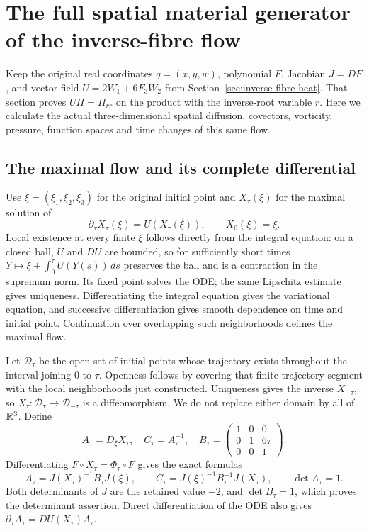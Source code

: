 \section{The full spatial material generator of the inverse-fibre flow}
\label{sec:material-generator}

Keep the original real coordinates $q=(x,y,w)$, polynomial $F$, Jacobian
$J=DF$, and vector field $U=2W_1+6F_3W_2$ from
Section~\ref{sec:inverse-fibre-heat}. That section proves $U\Pi=\Pi_{rr}$
on the product with the inverse-root variable $r$. Here we calculate the
actual three-dimensional spatial diffusion, covectors, vorticity,
pressure, function spaces and time changes of this same flow.

\subsection{The maximal flow and its complete differential}

Use $\xi=(\xi_1,\xi_2,\xi_3)$ for the original initial point and
$X_\tau(\xi)$ for the maximal solution of
\[
 \partial_\tau X_\tau(\xi)=U(X_\tau(\xi)),\qquad X_0(\xi)=\xi.
\]
Local existence at every finite $\xi$ follows directly from the integral
equation: on a closed ball, $U$ and $DU$ are bounded, so for sufficiently
short times $Y\mapsto\xi+\int_0^\tau U(Y(s))\,ds$ preserves the ball and
is a contraction in the supremum norm. Its fixed point solves the ODE;
the same Lipschitz estimate gives uniqueness. Differentiating the integral
equation gives the variational equation, and successive differentiation
gives smooth dependence on time and initial point. Continuation over
overlapping such neighborhoods defines the maximal flow.

Let $\mathcal D_\tau$ be the open set of initial points whose trajectory
exists throughout the interval joining $0$ to $\tau$. Openness follows
by covering that finite trajectory segment with the local neighborhoods
just constructed. Uniqueness gives the inverse $X_{-\tau}$, so
$X_\tau:\mathcal D_\tau\to\mathcal D_{-\tau}$ is a diffeomorphism.
We do not replace either domain by all of $\mathbb R^3$.
Define
\[
 A_\tau=D_\xi X_\tau,\quad C_\tau=A_\tau^{-1},\quad
 B_\tau=\begin{pmatrix}1&0&0\\0&1&6\tau\\0&0&1\end{pmatrix}.
\]
Differentiating $F\circ X_\tau=\Phi_\tau\circ F$ gives the exact formulas
\begin{equation}\label{eq:mg-A}
 A_\tau=J(X_\tau)^{-1}B_\tau J(\xi),\qquad
 C_\tau=J(\xi)^{-1}B_\tau^{-1}J(X_\tau),\qquad \det A_\tau=1.
\end{equation}
Both determinants of $J$ are the retained value $-2$, and $\det B_\tau=1$,
which proves the determinant assertion. Direct differentiation of the
ODE also gives $\partial_\tau A_\tau=DU(X_\tau)A_\tau$.

